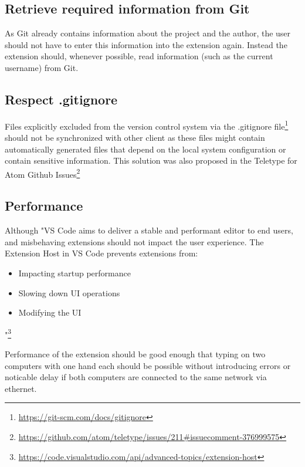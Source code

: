 \subsection{Retrieve required information from Git}

As Git already contains information about the project and the author, the user should not have to enter this information into the extension again. Instead the extension should, whenever possible, read information (such as the current username) from Git.

\subsection{Respect .gitignore}

Files explicitly excluded from the version control system via the .gitignore file\footnote{\href{https://git-scm.com/docs/gitignore}{https://git-scm.com/docs/gitignore}} should not be synchronized with other client as these files might contain automatically generated files that depend on the local system configuration or contain sensitive information. This solution was also proposed in the Teletype for Atom Github Issues\footnote{\href{https://github.com/atom/teletype/issues/211\#issuecomment-376999575}{https://github.com/atom/teletype/issues/211\#issuecomment-376999575}}

\subsection{Performance}

Although "VS Code aims to deliver a stable and performant editor to end users, and misbehaving extensions should not impact the user experience. The Extension Host in VS Code prevents extensions from:
\begin{itemize}
    \item Impacting startup performance
    \item Slowing down UI operations
    \item Modifying the UI
\end{itemize}"\footnote{\href{https://code.visualstudio.com/api/advanced-topics/extension-host}{https://code.visualstudio.com/api/advanced-topics/extension-host}}

Performance of the extension should be good enough that typing on two computers with one hand each should be possible without introducing errors or noticable delay if both computers are connected to the same network via ethernet.

